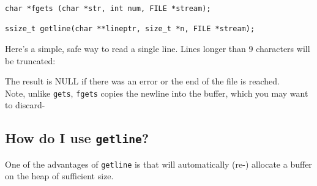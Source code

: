 \begin{verbatim}
char *fgets (char *str, int num, FILE *stream); 

ssize_t getline(char **lineptr, size_t *n, FILE *stream);
\end{verbatim}

Here's a simple, safe way to read a single line. Lines longer than 9
characters will be truncated:

\begin{Shaded}
\begin{Highlighting}[]
 \NormalTok{buffer[}\NormalTok{];}
 
\end{Highlighting}
\end{Shaded}

The result is NULL if there was an error or the end of the file is
reached.\\Note, unlike \texttt{gets}, \texttt{fgets} copies the newline
into the buffer, which you may want to discard-

\begin{Shaded}
\begin{Highlighting}[]
 \NormalTok{; }\NormalTok{\}}

 \NormalTok{;}
 
\end{Highlighting}
\end{Shaded}

\subsection{\texorpdfstring{How do I use
\texttt{getline}?}{How do I use getline?}}\label{how-do-i-use-getline}

One of the advantages of \texttt{getline} is that will automatically
(re-) allocate a buffer on the heap of sufficient size.

